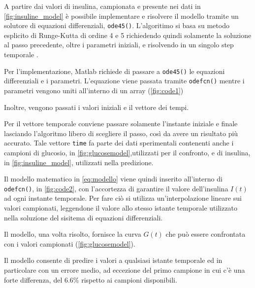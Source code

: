 A partire dai valori di insulina, campionata e presente nei dati in \cref{fig:insuline_model} è possibile implementare e risolvere il modello tramite un solutore di equazioni differenziali, \texttt{ode45()}. L'algoritimo si basa su metodo esplicito di Runge-Kutta di ordine 4 e 5 richiedendo quindi solamente la soluzione al passo precedente, oltre i parametri iniziali, e risolvendo in un singolo step temporale \cite{ode45}.

Per l'implementazione, Matlab richiede di passare a \texttt{ode45()} le equazioni differenziali e i parametri. L'equazione viene passata tramite \texttt{odefcn()} mentre i parametri vengono uniti all'interno di un array (\cref{fig:code1}) 

Inoltre, vengono passati i valori iniziali e il vettore dei tempi. 

Per il vettore temporale conviene passare solamente l'instante iniziale e finale lasciando l'algoritmo libero di scegliere il passo, così da avere un risultato più accurato. Tale vettore \texttt{time} fa parte dei dati sperimentali contenenti anche i campioni di glucosio, in \cref{fig:glucosemodel},utilizzati per il confronto, e di insulina, in \cref{fig:insuline_model}, utilizzati nella predizione.

Il modello matematico in \cref{eq:modello} viene quindi inserito all'interno di \texttt{odefcn()}, in \cref{fig:code2}, con l'accortezza di garantire il valore dell'insulina $I(t)$ ad ogni instante temporale. Per fare ciò si utilizza un'interpolazione lineare sui valori campionati, leggendone il valore allo stesso istante temporale utilizzato nella soluzione del sisitema di equazioni differenziali.



Il modello, una volta risolto, fornisce la curva $G(t)$ che può essere confrontata con i valori campionati (\cref{fig:glucosemodel}). 

Il modello consente di predire i valori a qualsiasi istante temporale ed in particolare con un errore medio, ad eccezione del primo campione in cui c'è una forte differenza, del 6.6\% rispetto ai campioni disponibili.


